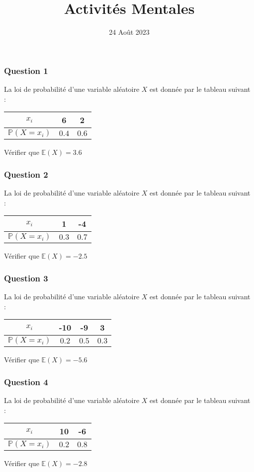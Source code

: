 \documentclass[15pt, mathserif]{beamer}
\title{Activités Mentales}
\date{24 Août 2023}
\newcommand{\Prem}{\mathbb{P}}	%
\begin{document}
\begin{frame}
    \titlepage
\end{frame}

\begin{frame} 
	\frametitle{Question 1}
La loi de probabilité d'une variable aléatoire $X$ est donnée par le tableau suivant : 
 \begin{center} 
 \begin{tabular}{|c|c|c|} 
 \hline 
 $x_i$ & 6 & 2 \\ 
 \hline $\Prem(X=x_i)$ & $0.4$ & $0.6$ \\ 
 \hline 
 \end{tabular} 
 \end{center} 
 Vérifier que $\mathbb{E}(X)=3.6$\end{frame}


\begin{frame} 
	\frametitle{Question 2}
La loi de probabilité d'une variable aléatoire $X$ est donnée par le tableau suivant : 
 \begin{center} 
 \begin{tabular}{|c|c|c|} 
 \hline 
 $x_i$ & 1 & -4 \\ 
 \hline $\Prem(X=x_i)$ & $0.3$ & $0.7$ \\ 
 \hline 
 \end{tabular} 
 \end{center} 
 Vérifier que $\mathbb{E}(X)=-2.5$\end{frame}


\begin{frame} 
	\frametitle{Question 3}
La loi de probabilité d'une variable aléatoire $X$ est donnée par le tableau suivant : 
 \begin{center} 
 \begin{tabular}{|c|c|c|c|} 
 \hline 
 $x_i$ & -10 & -9  & 3 \\ 
 \hline $\Prem(X=x_i)$ & $0.2$ & $0.5$ & $0.3$ \\ 
 \hline 
 \end{tabular} 
 \end{center} 
 Vérifier que $\mathbb{E}(X)=-5.6$\end{frame}


\begin{frame} 
	\frametitle{Question 4}
La loi de probabilité d'une variable aléatoire $X$ est donnée par le tableau suivant : 
 \begin{center} 
 \begin{tabular}{|c|c|c|} 
 \hline 
 $x_i$ & 10 & -6 \\ 
 \hline $\Prem(X=x_i)$ & $0.2$ & $0.8$ \\ 
 \hline 
 \end{tabular} 
 \end{center} 
 Vérifier que $\mathbb{E}(X)=-2.8$\end{frame}
\end{document}
